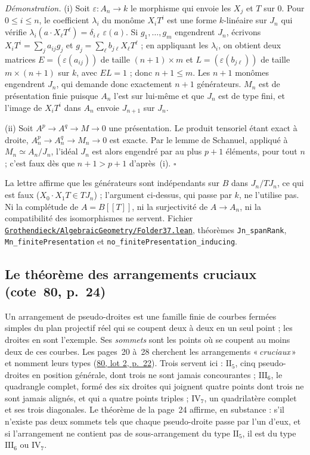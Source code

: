 \documentclass[11pt]{amsart}
\makeatletter
\newcommand{\q}[1]{«\,\textit{#1}\,»}
\def\RHM@first#1--#2\@nil{#1}
\DeclareRobustCommand{\lot}[3]{\begingroup\edef\RHM@pdfpage{\the\numexpr\RHM@first#3--\@nil+1\relax}\href{https://grothendieck.umontpellier.fr/#1.pdf\#page=\RHM@pdfpage}{#1, lot #2, p.~#3}\endgroup}
\newcommand{\leanfile}[1]{\href{https://github.com/Commutator-IO/GrothendieckArchivesProofs/blob/main/Grothendieck/#1.lean}{\nolinkurl{Grothendieck/#1.lean}}}
\newcommand{\lot}[3]{\href{https://grothendieck.commutator.io/\##1/#2/p#3}{#1, lot #2, p.~#3}}
\newcommand{\leanfile}[1]{\nolinkurl{Grothendieck/#1.lean}}
\makeatother
\begin{document}
\medskip\noindent\emph{Démonstration.} (i) Soit $\varepsilon\colon A_n \to k$ le morphisme qui envoie les $X_j$ et $T$ sur $0$. Pour $0 \leqslant i \leqslant n$, le coefficient $\lambda_i$ du monôme $X_iT^i$ est une forme $k$-linéaire sur $J_n$ qui vérifie $\lambda_i(a \cdot X_\ell T^\ell) = \delta_{i\ell}\,\varepsilon(a)$. Si $g_1, \dots, g_m$ engendrent $J_n$, écrivons $X_iT^i = \sum_j a_{ij} g_j$ et $g_j = \sum_\ell b_{j\ell} X_\ell T^\ell$ ; en appliquant les $\lambda_i$, on obtient deux matrices $E = (\varepsilon(a_{ij}))$ de taille $(n+1) \times m$ et $L = (\varepsilon(b_{j\ell}))$ de taille $m \times (n+1)$ sur $k$, avec $EL = 1$ ; donc $n + 1 \leqslant m$. Les $n+1$ monômes engendrent $J_n$, qui demande donc exactement $n+1$ générateurs. $M_n$ est de présentation finie puisque $A_n$ l'est sur lui-même et que $J_n$ est de type fini, et l'image de $X_iT^i$ dans $A_n$ envoie $J_{n+1}$ sur $J_n$.

(ii) Soit $A^p \to A^q \to M \to 0$ une présentation. Le produit tensoriel étant exact à droite, $A_n^p \to A_n^q \to M_n \to 0$ est exacte. Par le lemme de Schanuel, appliqué à $M_n \simeq A_n/J_n$, l'idéal $J_n$ est alors engendré par au plus $p + 1$ éléments, pour tout $n$ ; c'est faux dès que $n + 1 > p + 1$ d'après~(i). $\square$

\medskip La lettre affirme que les générateurs sont indépendants sur $B$ dans $J_n/TJ_n$, ce qui est faux ($X_0 \cdot X_1T \in TJ_n$) ; l'argument ci-dessus, qui passe par $k$, ne l'utilise pas. Ni la complétude de $A = B[[T]]$, ni la surjectivité de $A \to A_n$, ni la compatibilité des isomorphismes ne servent. Fichier \leanfile{AlgebraicGeometry/Folder37}, théorèmes \texttt{Jn\_spanRank}, \texttt{Mn\_finitePresentation} et \texttt{no\_finitePresentation\_inducing}.

\subsection*{Le théorème des arrangements cruciaux (cote~80, p.~24)}

Un arrangement de pseudo-droites est une famille finie de courbes fermées simples du plan projectif réel qui se coupent deux à deux en un seul point ; les droites en sont l'exemple. Ses \emph{sommets} sont les points où se coupent au moins deux de ces courbes. Les pages~20 à~28 cherchent les arrangements \q{cruciaux} et nomment leurs types (\lot{80}{2}{22}). Trois servent ici : $\mathrm{II}_5$, cinq pseudo-droites en position générale, dont trois ne sont jamais concourantes ; $\mathrm{III}_6$, le quadrangle complet, formé des six droites qui joignent quatre points dont trois ne sont jamais alignés, et qui a quatre points triples ; $\mathrm{IV}_7$, un quadrilatère complet et ses trois diagonales. Le théorème de la page~24 affirme, en substance : s'il n'existe pas deux sommets tels que chaque pseudo-droite passe par l'un d'eux, et si l'arrangement ne contient pas de sous-arrangement du type $\mathrm{II}_5$, il est du type $\mathrm{III}_6$ ou $\mathrm{IV}_7$.
\end{document}
